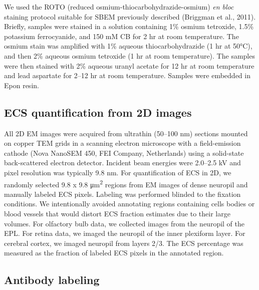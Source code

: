 \documentclass{article}
\begin{document}
We used the ROTO (reduced osmium-thiocarbohydrazide-osmium) \emph{en bloc} staining protocol suitable for SBEM previously described (Briggman et al., 2011). Briefly, samples were stained in a solution containing 1\% osmium tetroxide, 1.5\% potassium ferrocyanide, and 150 mM CB for 2 hr at room temperature. The osmium stain was amplified with 1\% aqueous thiocarbohydrazide (1 hr at 50°C), and then 2\% aqueous osmium tetroxide (1 hr at room temperature). The samples were then stained with 2\% aqueous uranyl acetate for 12 hr at room temperature and lead aspartate for 2–12 hr at room temperature. Samples were embedded in Epon resin.

\subsection*{ECS quantification from 2D images}

All 2D EM images were acquired from ultrathin (50–100 nm) sections mounted on copper TEM grids in a scanning electron microscope with a field-emission cathode (Nova NanoSEM 450, FEI Company, Netherlands) using a solid-state back-scattered electron detector. Incident beam energies were 2.0–2.5 kV and pixel resolution was typically 9.8 nm. For quantification of ECS in 2D, we randomly selected 9.8 x 9.8 μm\textsuperscript{2} regions from EM images of dense neuropil and manually labeled ECS pixels. Labeling was performed blinded to the fixation conditions. We intentionally avoided annotating regions containing cells bodies or blood vessels that would distort ECS fraction estimates due to their large volumes. For olfactory bulb data, we collected images from the neuropil of the EPL. For retina data, we imaged the neuropil of the inner plexiform layer. For cerebral cortex, we imaged neuropil from layers 2/3. The ECS percentage was measured as the fraction of labeled ECS pixels in the annotated region.

\subsection*{Antibody labeling}
\end{document}
